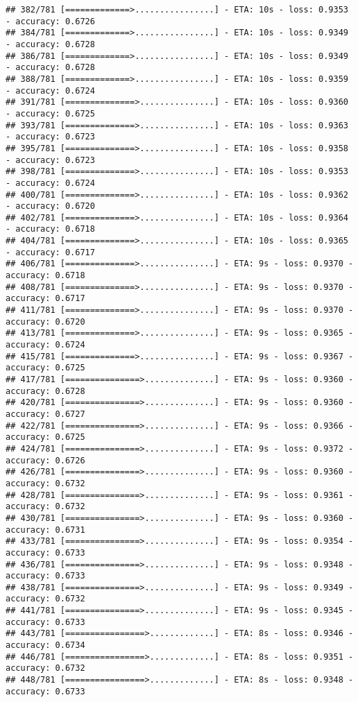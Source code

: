 \documentclass[
]{article}
\begin{document}
\begin{verbatim}
## 382/781 [=============>................] - ETA: 10s - loss: 0.9353 - accuracy: 0.6726
## 384/781 [=============>................] - ETA: 10s - loss: 0.9349 - accuracy: 0.6728
## 386/781 [=============>................] - ETA: 10s - loss: 0.9349 - accuracy: 0.6728
## 388/781 [=============>................] - ETA: 10s - loss: 0.9359 - accuracy: 0.6724
## 391/781 [==============>...............] - ETA: 10s - loss: 0.9360 - accuracy: 0.6725
## 393/781 [==============>...............] - ETA: 10s - loss: 0.9363 - accuracy: 0.6723
## 395/781 [==============>...............] - ETA: 10s - loss: 0.9358 - accuracy: 0.6723
## 398/781 [==============>...............] - ETA: 10s - loss: 0.9353 - accuracy: 0.6724
## 400/781 [==============>...............] - ETA: 10s - loss: 0.9362 - accuracy: 0.6720
## 402/781 [==============>...............] - ETA: 10s - loss: 0.9364 - accuracy: 0.6718
## 404/781 [==============>...............] - ETA: 10s - loss: 0.9365 - accuracy: 0.6717
## 406/781 [==============>...............] - ETA: 9s - loss: 0.9370 - accuracy: 0.6718 
## 408/781 [==============>...............] - ETA: 9s - loss: 0.9370 - accuracy: 0.6717
## 411/781 [==============>...............] - ETA: 9s - loss: 0.9370 - accuracy: 0.6720
## 413/781 [==============>...............] - ETA: 9s - loss: 0.9365 - accuracy: 0.6724
## 415/781 [==============>...............] - ETA: 9s - loss: 0.9367 - accuracy: 0.6725
## 417/781 [===============>..............] - ETA: 9s - loss: 0.9360 - accuracy: 0.6728
## 420/781 [===============>..............] - ETA: 9s - loss: 0.9360 - accuracy: 0.6727
## 422/781 [===============>..............] - ETA: 9s - loss: 0.9366 - accuracy: 0.6725
## 424/781 [===============>..............] - ETA: 9s - loss: 0.9372 - accuracy: 0.6726
## 426/781 [===============>..............] - ETA: 9s - loss: 0.9360 - accuracy: 0.6732
## 428/781 [===============>..............] - ETA: 9s - loss: 0.9361 - accuracy: 0.6732
## 430/781 [===============>..............] - ETA: 9s - loss: 0.9360 - accuracy: 0.6731
## 433/781 [===============>..............] - ETA: 9s - loss: 0.9354 - accuracy: 0.6733
## 436/781 [===============>..............] - ETA: 9s - loss: 0.9348 - accuracy: 0.6733
## 438/781 [===============>..............] - ETA: 9s - loss: 0.9349 - accuracy: 0.6732
## 441/781 [===============>..............] - ETA: 9s - loss: 0.9345 - accuracy: 0.6733
## 443/781 [================>.............] - ETA: 8s - loss: 0.9346 - accuracy: 0.6734
## 446/781 [================>.............] - ETA: 8s - loss: 0.9351 - accuracy: 0.6732
## 448/781 [================>.............] - ETA: 8s - loss: 0.9348 - accuracy: 0.6733

\end{verbatim}
\end{document}
